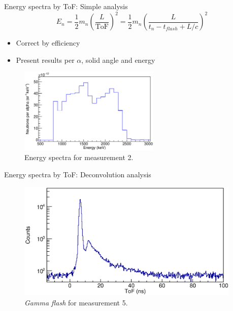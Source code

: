 \documentclass[11pt]{beamer}
\begin{document}
\begin{frame}{Energy spectra by ToF: Simple analysis}
	\[E_n=\frac{1}{2} m_n \left( \frac{L}{\text{ToF}} \right)^2 = \frac{1}{2} m_n \left( \frac{L}{t_n - t_{flash} + L/c} \right)^2\]
	\begin{itemize}
		\item Correct by efficiency
		\item Present results per $\alpha$, solid angle and energy
	\end{itemize}
	\begin{figure}[H]
		\centering
		\includegraphics[width=0.60\textwidth]{pulsed_energysimple.eps}
		\caption{Energy spectra for measurement 2.}
		\label{}
	\end{figure}
\end{frame}

\begin{frame}{Energy spectra by ToF: Deconvolution analysis}
	\begin{figure}[H]
		\centering
		\includegraphics[width=0.95\textwidth]{uneven_gflash.eps}
		\caption{\textit{Gamma flash} for measurement 5.}
		\label{uneven_gflash}
	\end{figure}
\end{frame}
\end{document}
